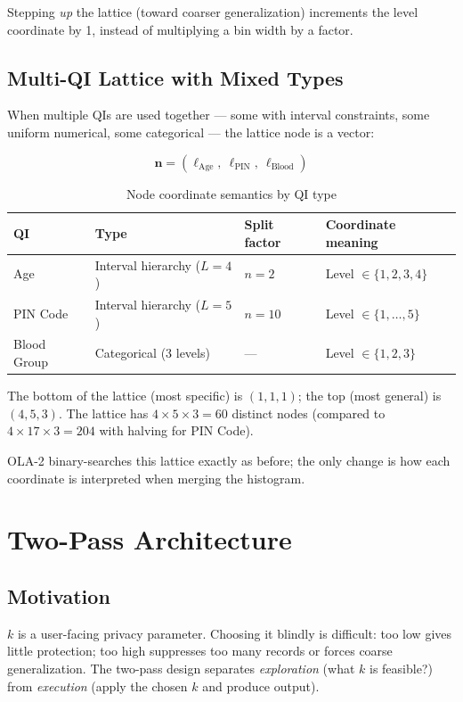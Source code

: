 \documentclass[12pt,a4paper]{article}
\begin{document}
Stepping \emph{up} the lattice (toward coarser generalization) increments the
level coordinate by 1, instead of multiplying a bin width by a factor.

\subsection{Multi-QI Lattice with Mixed Types}

When multiple QIs are used together — some with interval constraints, some
uniform numerical, some categorical — the lattice node is a vector:

\[
  \mathbf{n} = (\ell_{\text{Age}},\ \ell_{\text{PIN}},\ \ell_{\text{Blood}})
\]

\begin{table}[H]
\centering
\caption{Node coordinate semantics by QI type}
\begin{tabular}{llll}
\toprule
QI & Type & Split factor & Coordinate meaning \\
\midrule
Age      & Interval hierarchy ($L{=}4$) & $n{=}2$ & Level $\in \{1,2,3,4\}$ \\
PIN Code & Interval hierarchy ($L{=}5$) & $n{=}10$ & Level $\in \{1,\ldots,5\}$ \\
Blood Group & Categorical (3 levels)   & —        & Level $\in \{1,2,3\}$ \\
\bottomrule
\end{tabular}
\end{table}

The bottom of the lattice (most specific) is $(1,1,1)$; the top (most general)
is $(4,5,3)$. The lattice has $4 \times 5 \times 3 = 60$ distinct nodes
(compared to $4 \times 17 \times 3 = 204$ with halving for PIN Code).

OLA-2 binary-searches this lattice exactly as before; the only change is how
each coordinate is interpreted when merging the histogram.

\section{Two-Pass Architecture}

\subsection{Motivation}

$k$ is a user-facing privacy parameter. Choosing it blindly is difficult:
too low gives little protection; too high suppresses too many records or
forces coarse generalization. The two-pass design separates
\emph{exploration} (what $k$ is feasible?) from \emph{execution} (apply the
chosen $k$ and produce output).
\end{document}
